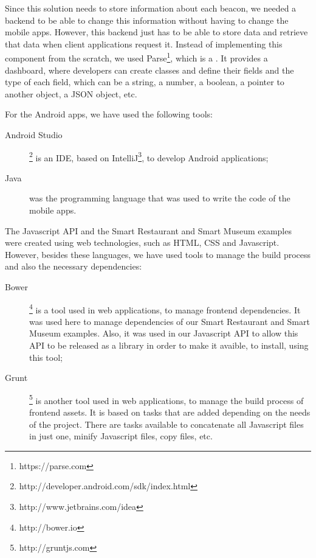 Since this solution needs to store information about each beacon, we
needed a backend to be able to change this information without having
to change the mobile apps.
However, this backend just has to be able to store data and retrieve that
data when client applications request it.
Instead of implementing this component from the scratch, we used
Parse\footnote{https://parse.com}, which is a .
It provides a dashboard, where developers can create classes
and define their fields and the type of each field, which can be a string,
a number, a boolean, a pointer to another object, a \gls{JSON} object, etc.

For the Android apps, we have used the following tools:
\begin{description}
  \item[Android Studio] \footnote{http://developer.android.com/sdk/index.html} is an \gls{IDE}, based on IntelliJ\footnote{http://www.jetbrains.com/idea},
  to develop Android
  applications;
  \item[Java] was the programming language that was used to write the code of the mobile apps.
\end{description}

The Javascript \gls{API} and the Smart Restaurant and Smart Museum examples were created using web technologies, such as \gls{HTML}, \gls{CSS} and Javascript.
However, besides these languages, we have used tools to manage the build process and also the necessary dependencies:
\begin{description}
  \item[Bower]\footnote{http://bower.io} is a tool used in web applications, to manage frontend dependencies. It was used here to manage dependencies of our Smart Restaurant and Smart Museum examples.
  Also, it was used in our Javascript \gls{API} to allow this \gls{API} to be released as a library in order to make it avaible, to install, using this tool;
  \item[Grunt]\footnote{http://gruntjs.com} is another tool used in web applications, to manage the build process of frontend assets.
  It is based on tasks that are added depending on the needs of the project.
  There are tasks available to concatenate all Javascript files in just one, minify Javascript files, copy files, etc.
\end{description}

